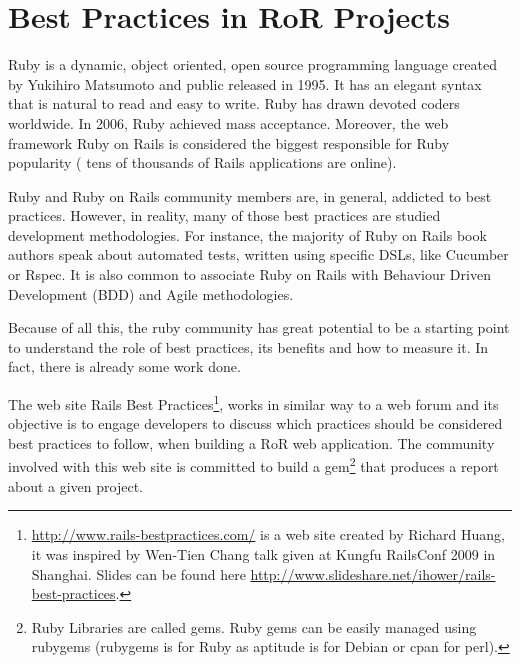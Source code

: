 \section{Best Practices in RoR Projects} \label{sec:ror_best_practives}
Ruby is a dynamic, object oriented, open source programming language created by Yukihiro Matsumoto and public released in 1995.
It has an elegant syntax that is natural to read and easy to write.
Ruby has drawn devoted coders worldwide. In 2006, Ruby achieved mass acceptance.
Moreover, the web framework Ruby on Rails is considered the biggest responsible for Ruby popularity
( tens of thousands of Rails applications are online).

Ruby and Ruby on Rails community members are, in general, addicted to best practices.
However, in reality, many of those best practices are studied development methodologies.
For instance, the majority of Ruby on Rails book authors speak about automated tests, written using specific DSLs, like Cucumber or Rspec.
It is also common to associate Ruby on Rails with Behaviour Driven Development (BDD) and Agile methodologies.

Because of all this, the ruby community has great potential to be a starting point to understand the role of best practices, its benefits and how to measure it.
In fact, there is already some work done.

The web site
\textsf{Rails Best Practices}\footnote{\url{http://www.rails-bestpractices.com/} is a web site created by Richard Huang,
it was inspired by Wen-Tien Chang talk given at Kungfu RailsConf 2009 in Shanghai. Slides can be found here
\url{http://www.slideshare.net/ihower/rails-best-practices}.},
works in similar way to a web forum and its objective is to engage developers to discuss which practices
should be considered best practices to follow, when building a RoR web application.
The community involved with this web site is committed to build a
gem\footnote{Ruby Libraries are called gems. Ruby gems can be easily managed using rubygems (rubygems is for Ruby as aptitude is for Debian or cpan for perl).}
that produces a report about a given project.


